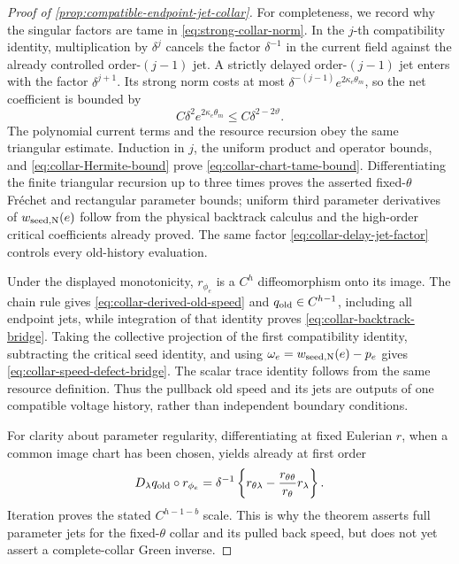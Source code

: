 \begin{proof}[Proof of \cref{prop:compatible-endpoint-jet-collar}]
For completeness, we record why the singular factors are tame in
\cref{eq:strong-collar-norm}.  In the \(j\)-th compatibility identity,
multiplication by \(\delta^j\) cancels the factor \(\delta^{-1}\) in the
current field against the already controlled order-\((j-1)\) jet.  A
strictly delayed order-\((j-1)\) jet enters with the factor
\(\delta^{j+1}\).  Its strong norm costs at most
\(\delta^{-(j-1)}e^{2\kappa_e\theta_m}\), so the net coefficient is bounded
by
\begin{equation}
 C\delta^2e^{2\kappa_e\theta_m}
 \le C\delta^{2-2\vartheta}.
                                                               \label{eq:collar-delay-jet-factor}
\end{equation}
The polynomial current terms and the resource recursion obey the same
triangular estimate.  Induction in \(j\), the uniform product and operator
bounds, and \cref{eq:collar-Hermite-bound} prove
\cref{eq:collar-chart-tame-bound}.  Differentiating the finite triangular
recursion up to three times proves the asserted fixed-\(\theta\) Fr\'{e}chet
and rectangular parameter bounds; uniform third parameter derivatives of
\(w_{\rm seed,N}(e)\) follow from the physical backtrack calculus and the
high-order critical coefficients already proved.  The same factor
\cref{eq:collar-delay-jet-factor} controls every old-history evaluation.

Under the displayed monotonicity, \(r_{\phi_e}\) is a \(C^h\)
diffeomorphism onto its image.  The chain rule gives
\cref{eq:collar-derived-old-speed} and \(q_{\rm old}\in C^{h-1}\), including
all endpoint jets, while integration of that identity proves
\cref{eq:collar-backtrack-bridge}.  Taking the collective projection of the
first compatibility identity, subtracting the critical seed identity, and
using \(\omega_e=w_{\rm seed,N}(e)-p_e\) gives
\cref{eq:collar-speed-defect-bridge}.  The scalar trace identity follows
from the same resource definition.  Thus the pullback old speed and its
jets are outputs of one compatible voltage history, rather than independent
boundary conditions.

For clarity about parameter regularity, differentiating at fixed Eulerian
\(r\), when a common image chart has been chosen, yields already at first
order
\[
 D_\lambda q_{\rm old}\circ r_{\phi_e}
 =\delta^{-1}\left\{
   r_{\theta\lambda}
   -\frac{r_{\theta\theta}}{r_\theta}r_\lambda\right\}.
\]
Iteration proves the stated \(C^{h-1-b}\) scale.  This is why the theorem
asserts full parameter jets for the fixed-\(\theta\) collar and its pulled
back speed, but does not yet assert a complete-collar Green inverse.
\end{proof}

